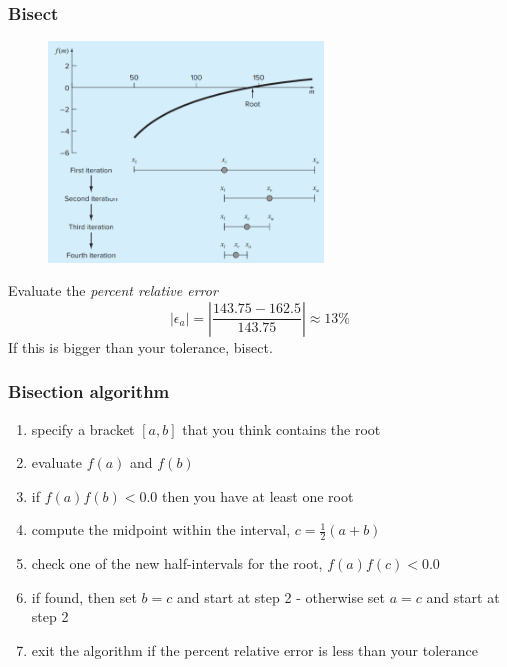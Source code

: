 \documentclass{if-beamer}
\begin{document}
\begin{frame}
\frametitle{Bisect}
\begin{figure}
	\center
	\includegraphics[width=0.65\textwidth]{figures/bracket4.png}
\end{figure}
Evaluate the \textit{percent relative error} 
$$ |\epsilon_a| = |\frac{143.75-162.5}{143.75}| \approx 13\%$$ 
If this is bigger than your tolerance, bisect.
\end{frame}


\begin{frame}[shrink=10]
\frametitle{Bisection algorithm}
\vspace{1cm}
\begin{enumerate}
\item specify a bracket $[a,b]$ that you think contains the root \\ \vspace{3pt}
\item evaluate $f(a)$ and $f(b)$ \\\vspace{3pt}
\item if $f(a)f(b) < 0.0$ then you have at least one root \\\vspace{3pt}
\item compute the midpoint within the interval, $c = \frac{1}{2}(a
+ b)$ \\\vspace{3pt}
\item check one of the new half-intervals for the root, $f(a)f(c) < 0.0$ \\\vspace{3pt}
\item if found, then set $b = c$ and start at step 2 - 
otherwise set $a = c$ and start at step 2 \\\vspace{3pt}
\item exit the algorithm if the percent relative error is less than your tolerance \\\vspace{3pt}
\end{enumerate}
\end{frame}
\end{document}
